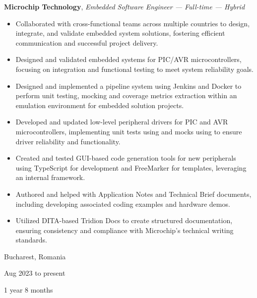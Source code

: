 \documentclass[10pt, a4paper]{article}
\newenvironment{highlights}{
    \begin{itemize}[
        topsep=0.1 cm,
        parsep=0.1 cm,
        partopsep=0pt,
        itemsep=0pt,
        leftmargin=0 cm + 10pt
    ]
}{
    \end{itemize}
} %
\newenvironment{twocolentry}[2][]{
    \onecolentry
    \def\secondColumn{#2}
    \setcolumnwidth{\fill, 3.5 cm}
    \begin{paracol}{2}
}{
    \switchcolumn \raggedleft \secondColumn
    \end{paracol}
    \endonecolentry
} %
\let\hrefWithoutArrow\href
\renewcommand{\href}[2]{\hrefWithoutArrow{#1}{\ifthenelse{\equal{#2}{}}{ }{#2 }\raisebox{.15ex}{\footnotesize \faExternalLink*}}}
\begin{document}
        
        \begin{twocolentry}{
            Bucharest, Romania

        Aug 2023 to present

        1 year 8 months
        }
            \textbf{Microchip Technology}, \textit{Embedded Software Engineer — Full-time — Hybrid}
            \begin{highlights}
                \item Collaborated with cross-functional teams across multiple countries to design, integrate, and validate embedded system solutions, fostering efficient communication and successful project delivery.
                \item Designed and validated embedded systems for PIC/AVR microcontrollers, focusing on integration and functional testing to meet system reliability goals.
                \item Designed and implemented a pipeline system using Jenkins and Docker to perform unit testing, mocking and coverage metrics extraction within an emulation environment for embedded solution projects.
                \item Developed and updated low-level peripheral drivers for PIC and AVR microcontrollers, implementing unit tests using \href{https://www.throwtheswitch.org/unity}{Unity} and mocks using \href{https://github.com/ThrowTheSwitch/CMock}{CMock} to ensure driver reliability and functionality.
                \item Created and tested GUI-based code generation tools for new peripherals using TypeScript for development and FreeMarker for templates, leveraging an internal framework.
                \item Authored and helped with Application Notes and Technical Brief documents, including developing associated coding examples and hardware demos.
                \item Utilized DITA-based Tridion Docs to create structured documentation, ensuring consistency and compliance with Microchip’s technical writing standards.
            \end{highlights}
        \end{twocolentry}


        \vspace{0.2 cm}
\end{document}
